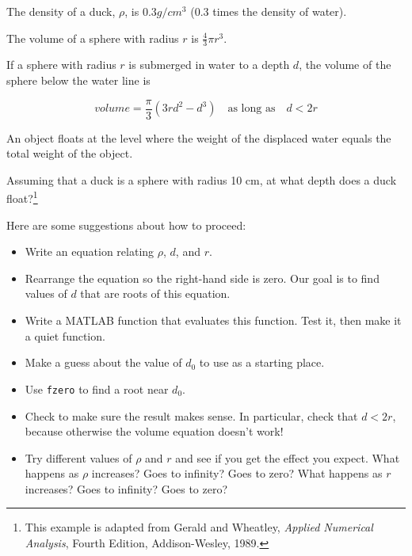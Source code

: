 \documentclass[
]{book}
\begin{document}
\begin{ex}
\label{ex:duck}

The density of a duck, $\rho$, is $0.3 g / cm^3$ (0.3 times the
density of water).

The volume of a sphere with radius $r$ is $\frac{4}{3} \pi r^3$.

If a sphere with radius $r$ is submerged in water to a depth $d$, the
volume of the sphere below the water line is

\begin{equation}
volume = \frac{\pi}{3} (3r d^2 - d^3) \quad
\mbox{as long as} \quad d < 2 r
\end{equation}

An object floats at the level where the weight of the displaced water
equals the total weight of the object.

Assuming that a duck is a sphere with radius 10 cm, at what depth does
a duck float?\footnote{This example is adapted from Gerald and Wheatley,
{\em Applied Numerical Analysis}, Fourth Edition, Addison-Wesley,
1989.}

Here are some suggestions about how to proceed:

\begin{itemize}

\item Write an equation relating $\rho$, $d$, and $r$.

\item Rearrange the equation so the right-hand side is zero.
Our goal is to find values of $d$ that are roots of this equation.

\item Write a MATLAB function that evaluates this function.  Test it,
   then make it a quiet function.

\item Make a guess about the value of $d_0$ to use as a starting place.

\item Use {\tt fzero} to find a root near $d_0$.

\item Check to make sure the result makes sense.  In particular,
   check that $d < 2 r$, because otherwise the volume equation
   doesn't work!

\item Try different values of $\rho$ and $r$ and see if you get the
effect you expect.  What happens as $\rho$ increases?  Goes to
infinity?  Goes to zero?  What happens as $r$ increases?  Goes to
infinity?  Goes to zero?

\end{itemize}


\end{ex}
\end{document}

